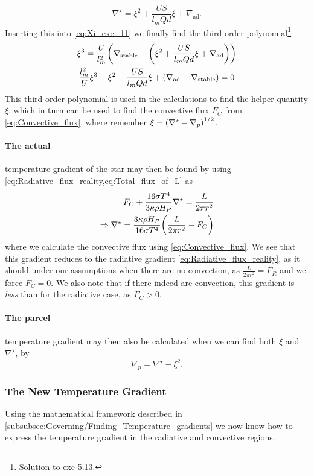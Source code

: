 \documentclass[11pt,a4paper,twocolumn,titlepage]{article}
\newcommand{\nablastb}
{
\nabla_{\text{stable}}
}
\newcommand{\nablaad}
{
\nabla_{\text{ad}}
}
\newcommand{\nablastar}
{
\nabla^\star
}
\newcommand{\nablap}
{
\nabla_{p}
}
\begin{document}
\begin{equation}
\nablastar = \xi^2 + \frac{US}{l_mQd}\xi + \nablaad. 
\label{eq:Nablastar_of_xi}
\end{equation}
Inserting this into \cref{eq:Xi_exe_11} we finally find the third order polynomial\footnote{Solution to exe 5.13.}
\begin{gather}
\xi^3 = \frac{U}{l_m^2}\qty(\nablastb - \qty(\xi^2 + \frac{US}{l_mQd}\xi + \nablaad)) \notag
\\
\frac{l_m^2}{U}\xi^3 +\xi^2+\frac{US}{l_mQd}\xi + \qty(\nablaad-\nablastb) = 0  \label{eq:Xi_third_order}
\end{gather}
This third order polynomial is used in the calculations to find the helper-quantity $\xi$, which in turn can be used to find the convective flux $F_C$ from \cref{eq:Convective_flux}, where remember $\xi = \qty(\nablastar-\nablap)^{1/2}$.

\paragraph{The actual} temperature gradient of the star may then be found by using \cref{eq:Radiative_flux_reality,eq:Total_flux_of_L} as
\begin{align}
F_C + \frac{16\sigma T^4}{3\kappa\rho H_P}\nablastar = \frac{L}{2\pi r^2} \notag
\\
\Rightarrow \nablastar = \frac{3\kappa \rho H_P}{16\sigma T^4}\qty(\frac{L}{2\pi r^2}-F_C) \label{eq:Nabla_star}
\end{align}
where we calculate the convective flux using \cref{eq:Convective_flux}. We see that this gradient reduces to the radiative gradient \cref{eq:Radiative_flux_reality}, as it should under our assumptions when there are no convection, as $\frac{L}{2\pi r^2}=F_R$ and we force $F_C = 0$. We also note that if there indeed are convection, this gradient is \textit{less} than for the radiative case, as $F_C > 0$.

\paragraph{The parcel} temperature gradient may then also be calculated when we can find both $\xi$ and $\nablastar$, by
\begin{equation*}
\nablap = \nablastar - \xi^2. \label{eq:Nabla_parcel}
\end{equation*}

\subsubsection{The New Temperature Gradient}\label{subsubsec:Governing/The_new_dTdm}
Using the mathematical framework described in \cref{subsubsec:Governing/Finding_Temperature_gradients} we now know how to express the temperature gradient in the radiative and convective regions.
\end{document}
